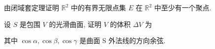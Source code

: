 由闭域套定理证明 $\mathbb{R}^2$ 中的有界无限点集 $E$ 在 $\mathbb{R}^2$ 中至少有一个聚点.\par
\par{}
设 $S$ 是包围 $V$ 的光滑曲面, 证明 $V$ 的体积 $\Delta V$ 为\par
\nopagebreak[4]
其中  $\cos\alpha,\cos\beta,\cos\gamma$  是曲面 S 外法线的方向余弦.\par
